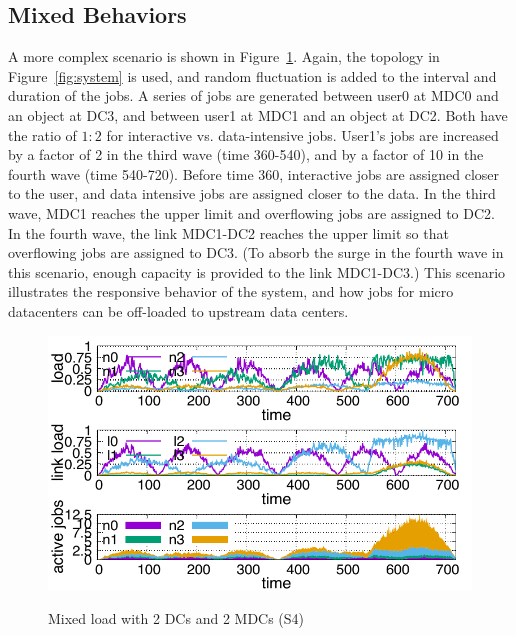 \subsection{Mixed Behaviors}

A more complex scenario is shown in Figure~\ref{fig:mixed}.
Again, the topology in Figure~\ref{fig:system} is used, and
random fluctuation is added to the interval and duration of the jobs.
A series of jobs are generated
between user0 at MDC0 and an object at DC3, and
between user1 at MDC1 and an object at DC2.
Both have the ratio of $1:2$ for interactive vs. data-intensive jobs.
User1's jobs are increased by a factor of 2 in the third wave (time
360-540), and by a factor of 10 in the fourth wave (time 540-720). 
Before time 360, interactive jobs are assigned closer to the user,
and data intensive jobs are assigned closer to the data.
In the third wave, MDC1 reaches the upper limit and overflowing jobs are
assigned to DC2.
In the fourth wave, the link MDC1-DC2 reaches the upper limit so that
overflowing jobs are assigned to DC3.
(To absorb the surge in the fourth wave in this scenario, enough
capacity is provided to the link MDC1-DC3.)
This scenario illustrates the responsive behavior of the system,
and how jobs for micro datacenters can be off-loaded to upstream data
centers.

\begin{figure}[tb]
  \begin{center}
    \includegraphics[width=1.0\columnwidth]{simu2.pdf}
    \vspace{-2.0ex}
    \caption{Mixed load with 2 DCs and 2 MDCs (S4)}
    \label{fig:mixed}
  \end{center}
\end{figure}

